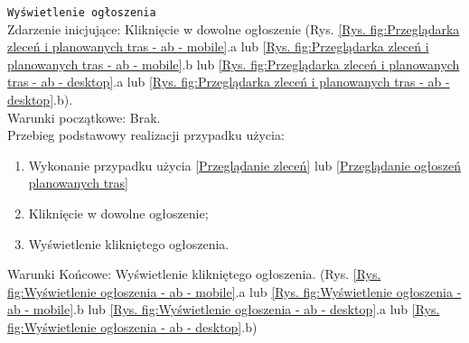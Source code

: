 \texttt{Wyświetlenie ogłoszenia} \\
Zdarzenie inicjujące: Kliknięcie w dowolne ogłoszenie (Rys. \ref{Rys. fig:Przeglądarka zleceń i planowanych tras - ab - mobile}.a lub \ref{Rys. fig:Przeglądarka zleceń i planowanych tras - ab - mobile}.b lub \ref{Rys. fig:Przeglądarka zleceń i planowanych tras - ab - desktop}.a lub \ref{Rys. fig:Przeglądarka zleceń i planowanych tras - ab - desktop}.b). \\
Warunki początkowe: Brak. \\
Przebieg podstawowy realizacji przypadku użycia:
\begin{enumerate}
    \item Wykonanie przypadku użycia \ref{Przeglądanie zleceń} lub \ref{Przeglądanie ogłoszeń planowanych tras}
    \item Kliknięcie w dowolne ogłoszenie;
    \item Wyświetlenie klikniętego ogłoszenia.
\end{enumerate}
Warunki Końcowe: Wyświetlenie klikniętego ogłoszenia. (Rys. \ref{Rys. fig:Wyświetlenie ogłoszenia - ab - mobile}.a lub \ref{Rys. fig:Wyświetlenie ogłoszenia - ab - mobile}.b lub \ref{Rys. fig:Wyświetlenie ogłoszenia - ab - desktop}.a lub \ref{Rys. fig:Wyświetlenie ogłoszenia - ab - desktop}.b)
